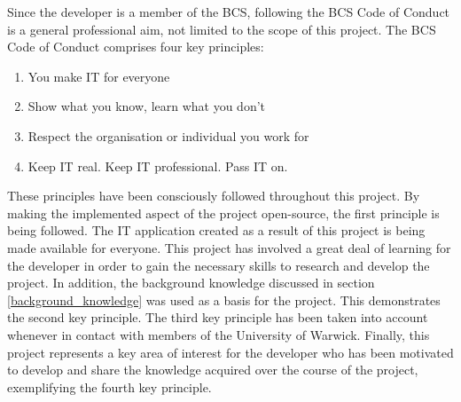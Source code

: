 %
%

Since the developer is a member of the BCS, following the BCS Code of Conduct \cite{bcs_code_of_conduct} is a general professional aim, not limited to the scope of this project. The BCS Code of Conduct comprises four key principles:
\begin{enumerate}
  \item You make IT for everyone
  \item Show what you know, learn what you don't
  \item Respect the organisation or individual you work for
  \item Keep IT real. Keep IT professional. Pass IT on.
\end{enumerate}

These principles have been consciously followed throughout this project. By making the implemented aspect of the project open-source, the first principle is being followed. The IT application created as a result of this project is being made available for everyone. This project has involved a great deal of learning for the developer in order to gain the necessary skills to research and develop the project. In addition, the background knowledge discussed in section \ref{background_knowledge} was used as a basis for the project. This demonstrates the second key principle. The third key principle has been taken into account whenever in contact with members of the University of Warwick. Finally, this project represents a key area of interest for the developer who has been motivated to develop and share the knowledge acquired over the course of the project, exemplifying the fourth key principle.
